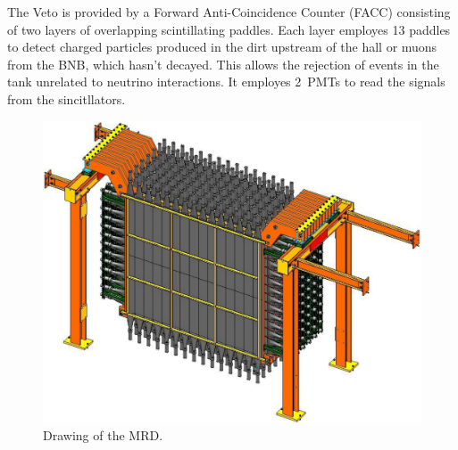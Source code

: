  The Veto is provided by a Forward Anti-Coincidence Counter (FACC) consisting of two layers %
 of overlapping scintillating paddles.
 Each layer employes 13 paddles to detect charged particles produced in the dirt %
 upstream of the hall or muons from the BNB, which hasn't decayed.
 This allows the rejection of events in the tank unrelated to neutrino interactions.
 It employes 2\inch~PMTs to read the signals from the sincitllators.

 \begin{figure}
   \centering
   \includegraphics[scale=.15]{pics/pag23Nakajimathesis}
   \caption{Drawing of the MRD.}
   \label{fig:mrd}
 \end{figure}
 
